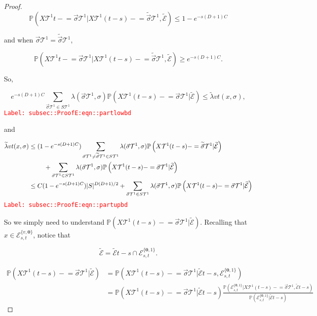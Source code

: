 \documentclass[12pt]{article}
\newcommand{\mb}{\mathbb}
\newcommand{\mc}{\mathcal}
\newcommand{\tr}{\textcolor{red}}
\newcommand{\labe}[1]{\tr{\texttt{Label: #1}}}
\newcommand{\pr}{\mb{P}}							%
\renewcommand{\root}{\mathbf{0}}				%
\renewcommand{\v}{v}							%
\renewcommand{\S}{S}							%
\newcommand{\s}{\sigma}							%
\newcommand{\sv}{\vec{\s}}						%
\newcommand{\x}{x}								%
\renewcommand{\t}{t}							%
\renewcommand{\tt}{s}							%
\newcommand{\X}{X}								%
\newcommand{\const}{C}							%
\newcommand{\degr}{D}							%
\newcommand{\tree}{\mc{T}}						%
\newcommand{\sln}[1]{^{#1}}						%
\newcommand{\rate}{\lambda}						%
\newcommand{\alt}[1]{\widetilde{#1}}			%
\newcommand{\evnt}{\mc{E}}						%
\newcommand{\crate}{\alt{\lambda}}				%
\begin{document}
\begin{proof}
\[\pr\left(\X{\tree\sln{1}}{\t-} = \sv{}{\tree\sln{1}}|\X{\tree\sln{1}}{(\t-\tt)-}=\alt{\sv}{}{\tree\sln{1}},\alt{\evnt}{	}\right) \leq 1-e^{-\tt(\degr+1)\const{}}\]

and when \(\sv{}{\tree\sln{1}}=\alt{\sv}{}{\tree\sln{1}}\),

\[\pr\left(\X{\tree\sln{1}}{\t-} = \sv{}{\tree\sln{1}}|\X{\tree\sln{1}}{(\t-\tt)-}=\alt{\sv}{}{\tree\sln{1}},\alt{\evnt}{	}\right) \geq e^{-\tt(\degr+1)\const{}}.\]

So,

\begin{equation}
e^{-\tt(\degr+1)\const{}}\sum_{\sv{}{\tree\sln{1}}\in \S{\tree\sln{1}}} \rate{}(\sv{}{\tree\sln{1}},\s)\pr\left(\X{\tree\sln{1}}{(\t-\tt)-}=\sv{}{\tree\sln{1}}|\alt{\evnt}{	}\right) \leq \crate{\v}{\t}(\x{}{},\s),
\label{subsec::ProofE:eqn::partlowbd}
\end{equation}
\labe{subsec::ProofE:eqn::partlowbd}

and

\begin{align}
\crate{\v}{\t}(\x{}{},\s)&\leq (1 - e^{-\tt(\degr+1)\const{}})\sum_{\sv{}{\tree\sln{1}}\neq \alt{\sv}{}{\tree\sln{1}} \in \S{\tree\sln{1}}} \rate{}(\sv{}{\tree\sln{1}},\s)\pr\left(\X{\tree\sln{1}}{(\t-\tt)-}=\alt{\sv}{}{\tree\sln{1}}|\alt{\evnt}{	}\right)\nonumber\\
&\hspace{24 pt} +\sum_{\sv{}{\tree\sln{1}} \in \S{\tree\sln{1}}} \rate{}(\sv{}{\tree\sln{1}},\s)\pr\left(\X{\tree\sln{1}}{(\t-\tt)-}=\sv{}{\tree\sln{1}}|\alt{\evnt}{	}\right)\nonumber\\
&\leq \const{}(1 - e^{-\tt(\degr+1)\const{}})|\S|^{\degr(\degr+1)/2} + \sum_{\sv{}{\tree\sln{1}} \in \S{\tree\sln{1}}} \rate{}(\sv{}{\tree\sln{1}},\s)\pr\left(\X{\tree\sln{1}}{(\t-\tt)-}=\sv{}{\tree\sln{1}}|\alt{\evnt}{	}\right)
\label{subsec::ProofE:eqn::partupbd}
\end{align}
\labe{subsec::ProofE:eqn::partupbd}

So we simply need to understand \(\pr\left(\X{\tree\sln{1}}{(\t-\tt)-}=\sv{}{\tree\sln{1}}|\alt{\evnt}{	}\right)\). Recalling that \(\x{}{} \in \evnt{}^{\{\v,\root\}}_{\tt,\t}\), notice that

\[\alt{\evnt}{	} = \alt{\evnt}{\t-\tt}\cap \evnt{}^{\{\root,1\}}_{\tt,\t}.\]

\begin{align*}
\pr\left(\X{\tree\sln{1}}{(\t-\tt)-}=\sv{}{\tree\sln{1}}|\alt{\evnt}{	}\right) &= \pr\left(\X{\tree\sln{1}}{(\t-\tt)-}=\sv{}{\tree\sln{1}}|\alt{\evnt}{\t-\tt},\evnt{}^{\{\root,1\}}_{\tt,\t}\right)\\
&=\pr\left(\X{\tree\sln{1}}{(\t-\tt)-}=\sv{}{\tree\sln{1}}|\alt{\evnt}{\t-\tt}\right)\frac{\pr\left(\evnt{}^{\{\root,1\}}_{\tt,\t}|\X{\tree\sln{1}}{(\t-\tt)-}=\sv{}{\tree\sln{1}},\alt{\evnt}{\t-\tt}\right)}{\pr\left(\evnt{}^{\{\root,1\}}_{\tt,\t}|\alt{\evnt}{\t-\tt}\right)}
\end{align*}


\end{proof}
\end{document}
